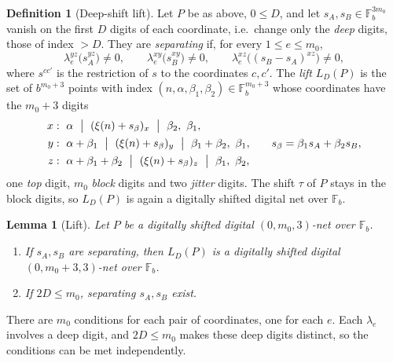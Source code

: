 \documentclass[11pt]{amsart}
\newtheorem{lemma}[theorem]{Lemma}
\theoremstyle{definition}
\newtheorem{definition}[theorem]{Definition}
\theoremstyle{plain}
\newcommand{\F}{\mathbb{F}}
\begin{document}
\begin{definition}[Deep-shift lift]\label{def:lift}
Let $P$ be as above, $0\le D$, and let $s_A,s_B\in\F_b^{3m_0}$ vanish on the first $D$ digits of each coordinate, i.e.\ change only the \emph{deep} digits, those of index $>D$. They are \emph{separating} if, for every $1\le e\le m_0$,
\[
\lambda^{yz}_e\bigl(s_A^{yz}\bigr)\ne0,\qquad \lambda^{xy}_e\bigl(s_B^{xy}\bigr)\ne0,\qquad \lambda^{xz}_e\bigl((s_B-s_A)^{xz}\bigr)\ne0,
\]
where $s^{cc'}$ is the restriction of $s$ to the coordinates $c,c'$. The \emph{lift} $L_D(P)$ is the set of $b^{m_0+3}$ points with index $(n,\alpha,\beta_1,\beta_2)\in\F_b^{m_0+3}$ whose coordinates have the $m_0+3$ digits
\[
\begin{aligned}
x&:\ \alpha\ \bigm|\ (\xi(n)+s_\beta)_x\ \bigm|\ \beta_2,\ \beta_1,\\
y&:\ \alpha+\beta_1\ \bigm|\ (\xi(n)+s_\beta)_y\ \bigm|\ \beta_1+\beta_2,\ \beta_1,\\
z&:\ \alpha+\beta_1+\beta_2\ \bigm|\ (\xi(n)+s_\beta)_z\ \bigm|\ \beta_1,\ \beta_2,
\end{aligned}
\qquad s_\beta=\beta_1s_A+\beta_2s_B,
\]
one \emph{top} digit, $m_0$ \emph{block} digits and two \emph{jitter} digits. The shift $\tau$ of $P$ stays in the block digits, so $L_D(P)$ is again a digitally shifted digital net over $\F_b$.
\end{definition}

\begin{lemma}[Lift]\label{lem:lift}
Let $P$ be a digitally shifted digital $(0,m_0,3)$-net over $\F_b$.
\begin{enumerate}
\item[(A)] If $s_A,s_B$ are separating, then $L_D(P)$ is a digitally shifted digital $(0,m_0+3,3)$-net over $\F_b$.
\item[(B)] If $2D\le m_0$, separating $s_A,s_B$ exist.
\end{enumerate}
\end{lemma}

There are $m_0$ conditions for each pair of coordinates, one for each $e$. Each $\lambda_e$ involves a deep digit, and $2D\le m_0$ makes these deep digits distinct, so the conditions can be met independently.
\end{document}
